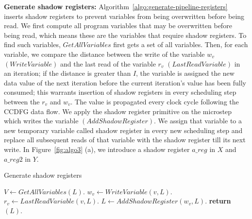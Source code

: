 {\bf Generate shadow registers:} Algorithm~\ref{algo:generate-pipeline-registers} inserts shadow registers
to prevent variables from being overwritten before being read. We first compute all program variables that may be
overwritten before being read, which means these are the variables that require shadow registers. To find such variables,
 $GetAllVariables$ first gets a set of all variables. Then, for each variable, we compare the distance between the write of
  the variable $w_v$ $(WriteVariable)$ and the last read of the variable $r_v$ $(LastReadVariable)$ in an iteration; if the
   distance is greater than $I$, the variable is assigned the new data value of the next iteration before the current iteration's value
    has been fully consumed; this warrants insertion of shadow registers in every scheduling step between the $r_v$ and $w_v$. The value is propagated every clock cycle following the CCDFG data flow.
We apply the shadow register primitive on the microstep which writes the variable $(AddShadowRegister)$. We assign that
 variable to a new temporary variable called shadow register in every new scheduling step and replace all subsequent reads of that variable with the shadow register till its next write. In Figure~\ref{fig:algo3} (a), we introduce a shadow register $a\_reg$ in $X$ and $a\_reg2$ in $Y$.

\begin{algorithm}
\caption{Generate shadow registers} \label{algo:generate-pipeline-registers}
\begin{algorithmic}[1]
\State $V \leftarrow GetAllVariables(L)$.
\State $w_v \leftarrow WriteVariable (v, L)$.
\State $r_v \leftarrow LastReadVariable (v, L)$.
\State $L \leftarrow AddShadowRegister (w_v, L)$.
\EndIf
\EndFor
\State \textbf{return} $(L)$.
\EndProcedure
\end{algorithmic}
\end{algorithm}


